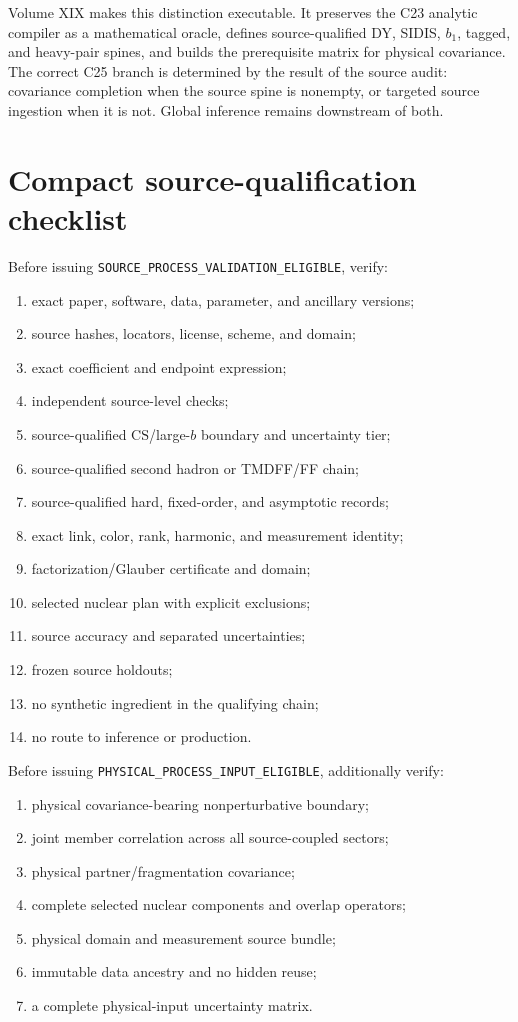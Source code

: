 \documentclass[11pt]{article}
\newcommand{\CS}{\ensuremath{\mathrm{CS}}}
\begin{document}
Volume XIX makes this distinction executable.  It preserves the C23 analytic compiler as a mathematical oracle, defines source-qualified DY, SIDIS, \(b_1\), tagged, and heavy-pair spines, and builds the prerequisite matrix for physical covariance.  The correct C25 branch is determined by the result of the source audit: covariance completion when the source spine is nonempty, or targeted source ingestion when it is not.  Global inference remains downstream of both.

\appendix

\section{Compact source-qualification checklist}
\label{app:checklist}

Before issuing \texttt{SOURCE\_PROCESS\_VALIDATION\_ELIGIBLE}, verify:
\begin{enumerate}
\item exact paper, software, data, parameter, and ancillary versions;
\item source hashes, locators, license, scheme, and domain;
\item exact coefficient and endpoint expression;
\item independent source-level checks;
\item source-qualified \CS/large-\(b\) boundary and uncertainty tier;
\item source-qualified second hadron or TMDFF/FF chain;
\item source-qualified hard, fixed-order, and asymptotic records;
\item exact link, color, rank, harmonic, and measurement identity;
\item factorization/Glauber certificate and domain;
\item selected nuclear plan with explicit exclusions;
\item source accuracy and separated uncertainties;
\item frozen source holdouts;
\item no synthetic ingredient in the qualifying chain;
\item no route to inference or production.
\end{enumerate}

Before issuing \texttt{PHYSICAL\_PROCESS\_INPUT\_ELIGIBLE}, additionally verify:
\begin{enumerate}
\item physical covariance-bearing nonperturbative boundary;
\item joint member correlation across all source-coupled sectors;
\item physical partner/fragmentation covariance;
\item complete selected nuclear components and overlap operators;
\item physical domain and measurement source bundle;
\item immutable data ancestry and no hidden reuse;
\item a complete physical-input uncertainty matrix.
\end{enumerate}
\end{document}
